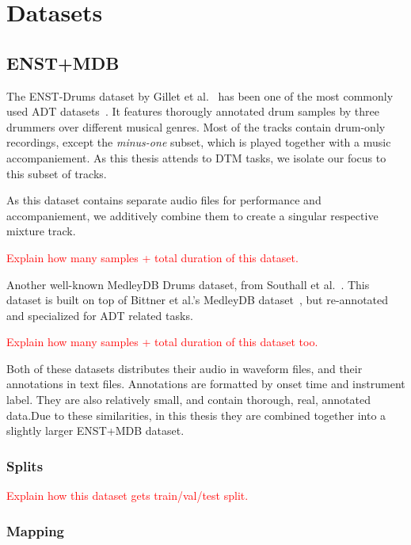 \chapter{Datasets}

\section{ENST+MDB}

The ENST-Drums dataset by Gillet et al.~\cite{gillet_2006_7432188} has been one of the most commonly used \gls{ADT} datasets~\cite{8350302}. It features thorougly annotated drum samples by three drummers over different musical genres. Most of the tracks contain drum-only recordings, except the \textit{minus-one} subset, which is played together with a music accompaniement. As this thesis attends to \gls{DTM} tasks, we isolate our focus to this subset of tracks.

As this dataset contains separate audio files for performance and accompaniement, we additively combine them to create a singular respective mixture track.

\textcolor{red}{Explain how many samples + total duration of this dataset.}

Another well-known MedleyDB Drums dataset, from Southall et al.~\cite{southall2017mdb}. This dataset is built on top of Bittner et al.'s MedleyDB dataset~\cite{rachel_bittner_2014_1438309}, but re-annotated and specialized for \gls{ADT} related tasks.

\textcolor{red}{Explain how many samples + total duration of this dataset too.}

Both of these datasets distributes their audio in waveform files, and their annotations in text files. Annotations are formatted by onset time and instrument label. They are also relatively small, and contain thorough, real, annotated data.Due to these similarities, in this thesis they are combined together into a slightly larger ENST+MDB dataset.

\subsection{Splits}

\textcolor{red}{Explain how this dataset gets train/val/test split.}

\subsection{Mapping}

